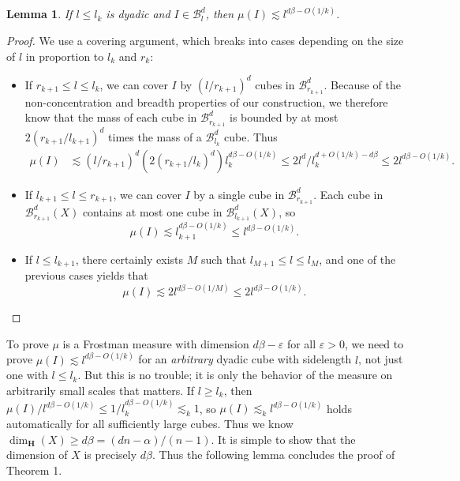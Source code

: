 \documentclass[dvipsnames]{article}
\theoremstyle{plain}
\newtheorem{lemma}{Lemma}
\theoremstyle{plain}
\begin{document}
\begin{lemma}
	If $l \leq l_k$ is dyadic and $I \in \mathcal{B}^d_l$, then $\mu(I) \lesssim l^{d\beta - O(1/k)}$.
\end{lemma}
\begin{proof}
	We use a covering argument, which breaks into cases depending on the size of $l$ in proportion to $l_k$ and $r_k$:
	\begin{itemize}
		\item If $r_{k+1} \leq l \leq l_k$, we can cover $I$ by $(l/r_{k+1})^d$ cubes in $\mathcal{B}^d_{r_{k+1}}$. Because of the non-concentration and breadth properties of our construction, we therefore know that the mass of each cube in $\mathcal{B}^d_{r_{k+1}}$ is bounded by at most $2(r_{k+1}/l_{k+1})^d$ times the mass of a $\mathcal{B}^d_{l_k}$ cube. Thus
		\begin{align*}
			\mu(I) &\lesssim (l/r_{k+1})^d (2(r_{k+1}/l_k)^d) l_k^{d \beta - O(1/k)} \leq 2 l^d / l_k^{d + O(1/k) - d \beta} \leq 2 l^{d \beta - O(1/k)}.
		\end{align*}

		\item If $l_{k+1} \leq l \leq r_{k+1}$, we can cover $I$ by a single cube in $\mathcal{B}^d_{r_{k+1}}$. Each cube in $\mathcal{B}^d_{r_{k+1}}(X)$ contains at most one cube in $\mathcal{B}^d_{l_{k+1}}(X)$, so
		\[ \mu(I) \lesssim l_{k+1}^{d\beta - O(1/k)} \leq l^{d \beta - O(1/k)}. \]

		\item If $l \leq l_{k+1}$, there certainly exists $M$ such that $l_{M+1} \leq l \leq l_M$, and one of the previous cases yields that
		\[ \mu(I) \lesssim 2 l^{d \beta - O(1/M)} \leq 2 l^{d \beta - O(1/k)}. \tag*{\qedhere} \]
	\end{itemize}
\end{proof}

To prove $\mu$ is a Frostman measure with dimension $d \beta - \varepsilon$ for all $\varepsilon > 0$, we need to prove $\mu(I) \lesssim l^{d \beta - O(1/k)}$ for an {\it arbitrary} dyadic cube with sidelength $l$, not just one with $l \leq l_k$. But this is no trouble; it is only the behavior of the measure on arbitrarily small scales that matters. If $l \geq l_k$, then $\mu(I)/l^{d \beta - O(1/k)} \leq 1/l_k^{d \beta - O(1/k)} \lesssim_k 1$, so $\mu(I) \lesssim_k l^{d \beta - O(1/k)}$ holds automatically for all sufficiently large cubes. Thus we know $\dim_{\mathbf{H}}(X) \geq d\beta = (dn - \alpha)/(n-1)$. It is simple to show that the dimension of $X$ is precisely $d\beta$. Thus the following lemma concludes the proof of Theorem 1.
\end{document}
